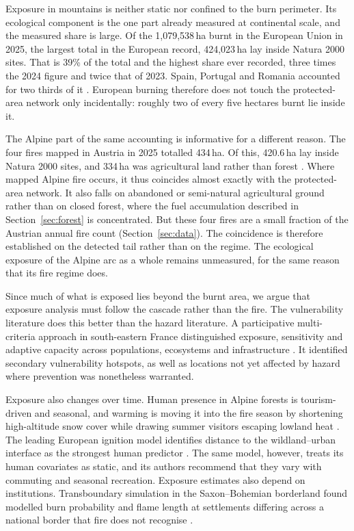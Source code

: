\documentclass[11pt,a4paper]{article}
\begin{document}
Exposure in mountains is neither static nor confined to the burn perimeter. Its ecological component is the one part already measured at continental scale, and the measured share is large. Of the 1{,}079{,}538\,ha burnt in the European Union in 2025, the largest total in the European record, 424{,}023\,ha lay inside Natura 2000 sites. That is 39\% of the total and the highest share ever recorded, three times the 2024 figure and twice that of 2023. Spain, Portugal and Romania accounted for two thirds of it \citep{jrc_advance_2026}. European burning therefore does not touch the protected-area network only incidentally: roughly two of every five hectares burnt lie inside it.

The Alpine part of the same accounting is informative for a different reason. The four fires mapped in Austria in 2025 totalled 434\,ha. Of this, 420.6\,ha lay inside Natura 2000 sites, and 334\,ha was agricultural land rather than forest \citep{jrc_advance_2026}. Where mapped Alpine fire occurs, it thus coincides almost exactly with the protected-area network. It also falls on abandoned or semi-natural agricultural ground rather than on closed forest, where the fuel accumulation described in Section~\ref{sec:forest} is concentrated. But these four fires are a small fraction of the Austrian annual fire count (Section~\ref{sec:data}). The coincidence is therefore established on the detected tail rather than on the regime. The ecological exposure of the Alpine arc as a whole remains unmeasured, for the same reason that its fire regime does.

Since much of what is exposed lies beyond the burnt area, we argue that exposure analysis must follow the cascade rather than the fire. The vulnerability literature does this better than the hazard literature. A participative multi-criteria approach in south-eastern France distinguished exposure, sensitivity and adaptive capacity across populations, ecosystems and infrastructure \citep{riviere_mapping_2023}. It identified secondary vulnerability hotspots, as well as locations not yet affected by hazard where prevention was nonetheless warranted.

Exposure also changes over time. Human presence in Alpine forests is tourism-driven and seasonal, and warming is moving it into the fire season by shortening high-altitude snow cover while drawing summer visitors escaping lowland heat \citep{pede_mountain_2022, abrham_wildfires_2024}. The leading European ignition model identifies distance to the wildland--urban interface as the strongest human predictor \citep{gelabert_assessing_2025}. The same model, however, treats its human covariates as static, and its authors recommend that they vary with commuting and seasonal recreation. Exposure estimates also depend on institutions. Transboundary simulation in the Saxon--Bohemian borderland found modelled burn probability and flame length at settlements differing across a national border that fire does not recognise \citep{avouris_exposure_2025}.
\end{document}
